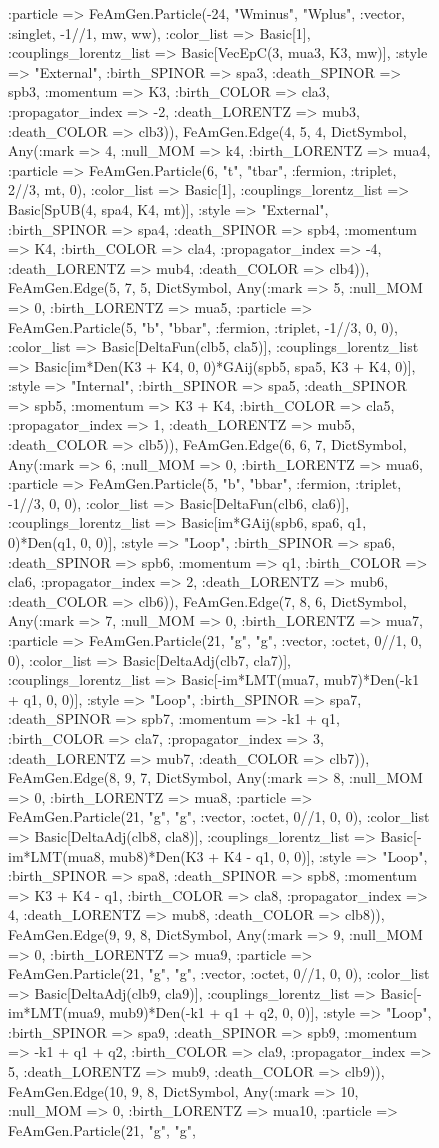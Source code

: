 \documentclass{revtex4}
\begin{document}
\begin{figure}[!htb]
\begin{center}
{:particle => FeAmGen.Particle(-24, "Wminus", "Wplus", :vector, :singlet, -1//1, mw, ww), :color_list => Basic[1], :couplings_lorentz_list => Basic[VecEpC(3, mua3, K3, mw)], :style => "External", :birth_SPINOR => spa3, :death_SPINOR => spb3, :momentum => K3, :birth_COLOR => cla3, :propagator_index => -2, :death_LORENTZ => mub3, :death_COLOR => clb3)), FeAmGen.Edge(4, 5, 4, Dict{Symbol, Any}(:mark => 4, :null_MOM => k4, :birth_LORENTZ => mua4, :particle => FeAmGen.Particle(6, "t", "tbar", :fermion, :triplet, 2//3, mt, 0), :color_list => Basic[1], :couplings_lorentz_list => Basic[SpUB(4, spa4, K4, mt)], :style => "External", :birth_SPINOR => spa4, :death_SPINOR => spb4, :momentum => K4, :birth_COLOR => cla4, :propagator_index => -4, :death_LORENTZ => mub4, :death_COLOR => clb4)), FeAmGen.Edge(5, 7, 5, Dict{Symbol, Any}(:mark => 5, :null_MOM => 0, :birth_LORENTZ => mua5, :particle => FeAmGen.Particle(5, "b", "bbar", :fermion, :triplet, -1//3, 0, 0), :color_list => Basic[DeltaFun(clb5, cla5)], :couplings_lorentz_list => Basic[im*Den(K3 + K4, 0, 0)*GAij(spb5, spa5, K3 + K4, 0)], :style => "Internal", :birth_SPINOR => spa5, :death_SPINOR => spb5, :momentum => K3 + K4, :birth_COLOR => cla5, :propagator_index => 1, :death_LORENTZ => mub5, :death_COLOR => clb5)), FeAmGen.Edge(6, 6, 7, Dict{Symbol, Any}(:mark => 6, :null_MOM => 0, :birth_LORENTZ => mua6, :particle => FeAmGen.Particle(5, "b", "bbar", :fermion, :triplet, -1//3, 0, 0), :color_list => Basic[DeltaFun(clb6, cla6)], :couplings_lorentz_list => Basic[im*GAij(spb6, spa6, q1, 0)*Den(q1, 0, 0)], :style => "Loop", :birth_SPINOR => spa6, :death_SPINOR => spb6, :momentum => q1, :birth_COLOR => cla6, :propagator_index => 2, :death_LORENTZ => mub6, :death_COLOR => clb6)), FeAmGen.Edge(7, 8, 6, Dict{Symbol, Any}(:mark => 7, :null_MOM => 0, :birth_LORENTZ => mua7, :particle => FeAmGen.Particle(21, "g", "g", :vector, :octet, 0//1, 0, 0), :color_list => Basic[DeltaAdj(clb7, cla7)], :couplings_lorentz_list => Basic[-im*LMT(mua7, mub7)*Den(-k1 + q1, 0, 0)], :style => "Loop", :birth_SPINOR => spa7, :death_SPINOR => spb7, :momentum => -k1 + q1, :birth_COLOR => cla7, :propagator_index => 3, :death_LORENTZ => mub7, :death_COLOR => clb7)), FeAmGen.Edge(8, 9, 7, Dict{Symbol, Any}(:mark => 8, :null_MOM => 0, :birth_LORENTZ => mua8, :particle => FeAmGen.Particle(21, "g", "g", :vector, :octet, 0//1, 0, 0), :color_list => Basic[DeltaAdj(clb8, cla8)], :couplings_lorentz_list => Basic[-im*LMT(mua8, mub8)*Den(K3 + K4 - q1, 0, 0)], :style => "Loop", :birth_SPINOR => spa8, :death_SPINOR => spb8, :momentum => K3 + K4 - q1, :birth_COLOR => cla8, :propagator_index => 4, :death_LORENTZ => mub8, :death_COLOR => clb8)), FeAmGen.Edge(9, 9, 8, Dict{Symbol, Any}(:mark => 9, :null_MOM => 0, :birth_LORENTZ => mua9, :particle => FeAmGen.Particle(21, "g", "g", :vector, :octet, 0//1, 0, 0), :color_list => Basic[DeltaAdj(clb9, cla9)], :couplings_lorentz_list => Basic[-im*LMT(mua9, mub9)*Den(-k1 + q1 + q2, 0, 0)], :style => "Loop", :birth_SPINOR => spa9, :death_SPINOR => spb9, :momentum => -k1 + q1 + q2, :birth_COLOR => cla9, :propagator_index => 5, :death_LORENTZ => mub9, :death_COLOR => clb9)), FeAmGen.Edge(10, 9, 8, Dict{Symbol, Any}(:mark => 10, :null_MOM => 0, :birth_LORENTZ => mua10, :particle => FeAmGen.Particle(21, "g", "g", }
\end{center}
\end{figure}
\end{document}
